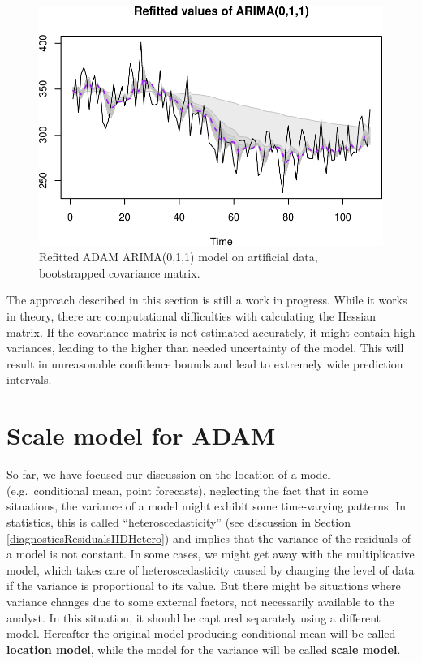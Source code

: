 \documentclass[]{book}
\theoremstyle{definition}
\theoremstyle{definition}
\theoremstyle{definition}
\theoremstyle{definition}
\theoremstyle{remark}
\begin{document}
\begin{figure}
\centering
\includegraphics{Svetunkov--2022----ADAM_files/figure-latex/adamARIMARefitted200-1.pdf}
\caption{\label{fig:adamARIMARefitted200}Refitted ADAM ARIMA(0,1,1) model on artificial data, bootstrapped covariance matrix.}
\end{figure}

The approach described in this section is still a work in progress. While it works in theory, there are computational difficulties with calculating the Hessian matrix. If the covariance matrix is not estimated accurately, it might contain high variances, leading to the higher than needed uncertainty of the model. This will result in unreasonable confidence bounds and lead to extremely wide prediction intervals.

\hypertarget{ADAMscaleModel}{%
\chapter{Scale model for ADAM}\label{ADAMscaleModel}}

So far, we have focused our discussion on the location of a model (e.g.~conditional mean, point forecasts), neglecting the fact that in some situations, the variance of a model might exhibit some time-varying patterns. In statistics, this is called ``heteroscedasticity'' (see discussion in Section \ref{diagnosticsResidualsIIDHetero}) and implies that the variance of the residuals of a model is not constant. In some cases, we might get away with the multiplicative model, which takes care of heteroscedasticity caused by changing the level of data if the variance is proportional to its value. But there might be situations where variance changes due to some external factors, not necessarily available to the analyst. In this situation, it should be captured separately using a different model. Hereafter the original model producing conditional mean will be called \textbf{location model}, while the model for the variance will be called \textbf{scale model}.
\end{document}
